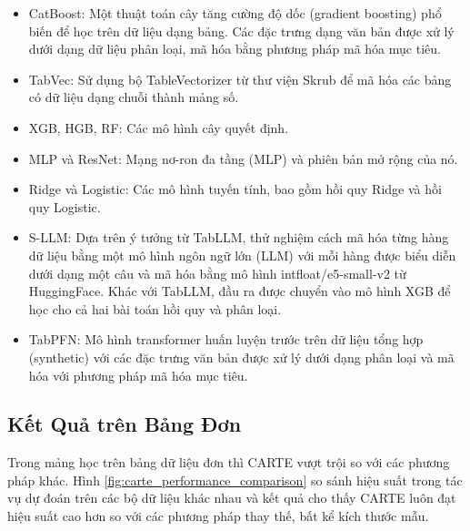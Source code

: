 \documentclass{article}
\begin{document}
\begin{itemize}
    \item CatBoost: Một thuật toán cây tăng cường độ dốc (gradient boosting) phổ biến để học trên dữ liệu dạng bảng. Các đặc trưng dạng văn bản được xử lý dưới dạng dữ liệu phân loại, mã hóa bằng phương pháp mã hóa mục tiêu.
    \item TabVec: Sử dụng bộ TableVectorizer từ thư viện Skrub để mã hóa các bảng có dữ liệu dạng chuỗi thành mảng số.
    \item XGB, HGB, RF: Các mô hình cây quyết định.
    \item MLP và ResNet: Mạng nơ-ron đa tầng (MLP) và phiên bản mở rộng của nó.
    \item Ridge và Logistic: Các mô hình tuyến tính, bao gồm hồi quy Ridge và hồi quy Logistic.
    \item S-LLM: Dựa trên ý tưởng từ TabLLM, thử nghiệm cách mã hóa từng hàng dữ liệu bằng một mô hình ngôn ngữ lớn (LLM) với mỗi hàng được biểu diễn dưới dạng một câu và mã hóa bằng mô hình intfloat/e5-small-v2 từ HuggingFace. Khác với TabLLM, đầu ra được chuyển vào mô hình XGB để học cho cả hai bài toán hồi quy và phân loại. 
    \item TabPFN: Mô hình transformer huấn luyện trước trên dữ liệu tổng hợp (synthetic) với các đặc trưng văn bản được xử lý dưới dạng phân loại và mã hóa với phương pháp mã hóa mục tiêu.
\end{itemize}


\subsection{Kết Quả trên Bảng Đơn} 
Trong mảng học trên bảng dữ liệu đơn thì CARTE vượt trội so với các phương pháp khác. Hình \ref{fig:carte_performance_comparison} so sánh hiệu suất trong tác vụ dự đoán trên các bộ dữ liệu khác nhau và kết quả cho thấy CARTE luôn đạt hiệu suất cao hơn so với các phương pháp thay thế, bất kể kích thước mẫu.
\end{document}
